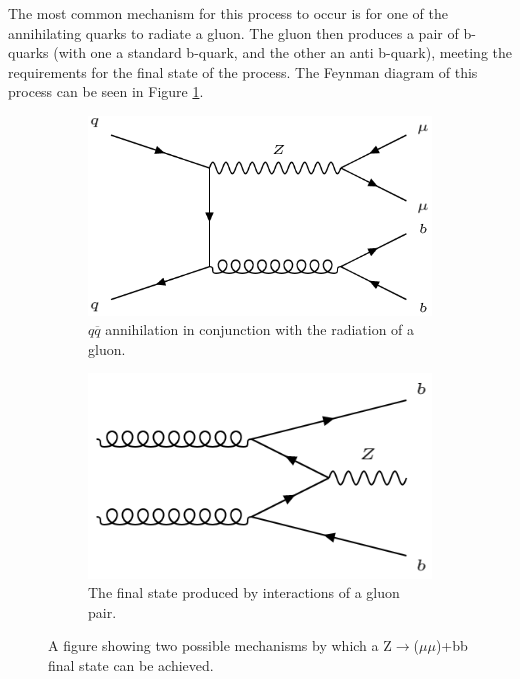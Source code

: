 \documentclass[12pt,a4paper,epsf,portrait,times,epsfig]{article}
\begin{document}
		The most common mechanism for this process to occur is for one of the annihilating quarks to radiate a gluon. The gluon then produces a pair of b-quarks (with one a standard b-quark, and the other an anti b-quark), meeting the requirements for the final state of the process. The Feynman diagram of this process can be seen in Figure \ref{Fig:SFigAnnihilationFeynman}. \par
		
		
		\begin{figure}[h!]
			\begin{subfigure}{.45\textwidth}
				\centering
				\includegraphics[scale=0.5]{Zbb_2.png}
				\caption{$q\overline{q}$ annihilation in conjunction with \newline the radiation of a gluon.}
				\label{Fig:SFigAnnihilationFeynman}
			\end{subfigure}
			\begin{subfigure}{.45\textwidth}
				\centering
				\includegraphics[scale=0.42]{Gluon_Pair.png}
				\caption{The final state produced by interactions \newline of a gluon pair.}
				\label{Fig:SFigGluonPairFeynman}
			\end{subfigure}
			\caption{A figure showing two possible mechanisms by which a Z$\rightarrow$($\mu\mu$)+bb final state can be achieved. }
			\label{Fig:FeynmanProcesses}
		\end{figure}
		
\end{document}
